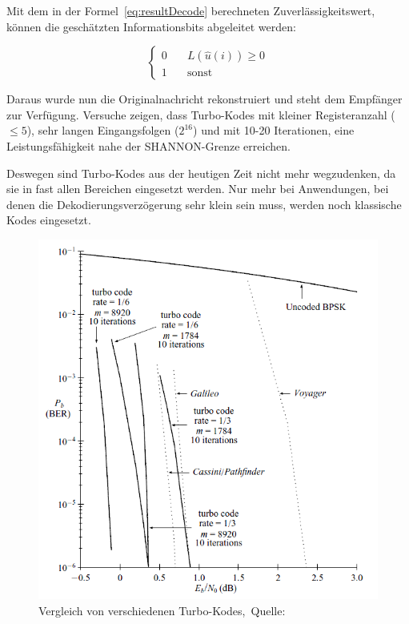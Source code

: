Mit dem in der Formel~\ref{eq:resultDecode} berechneten Zuverlässigkeitswert, können die geschätzten Informationsbits abgeleitet werden:

\begin{equation*}
\begin{cases}
0 & \quad L(\widehat{u}(i)) \geq 0 \\
1 & \quad \text{sonst}
\end{cases}
\end{equation*}

Daraus wurde nun die Originalnachricht rekonstruiert und steht dem Empfänger zur Verfügung. Versuche zeigen, dass Turbo-Kodes mit kleiner Registeranzahl ($\leq 5$), sehr langen Eingangsfolgen ($2^{16}$) und mit 10-20 Iterationen, eine Leistungsfähigkeit nahe der SHANNON-Grenze erreichen.~\cite[265]{schoenfeld2012informations}

Deswegen sind Turbo-Kodes aus der heutigen Zeit nicht mehr wegzudenken, da sie in fast allen Bereichen eingesetzt werden. Nur mehr bei Anwendungen, bei denen die Dekodierungsverzögerung sehr klein sein muss, werden noch klassische Kodes eingesetzt.

\begin{figure}[th]
\centering
\includegraphics[width=\ScaleIfNeeded]{pictures/ComparisonTurbo}
\caption{Vergleich von verschiedenen Turbo-Kodes,~Quelle:~\cite[603]{huffman2010fundamentals}}
\label{pic:comparisonTurbo}
\end{figure}

